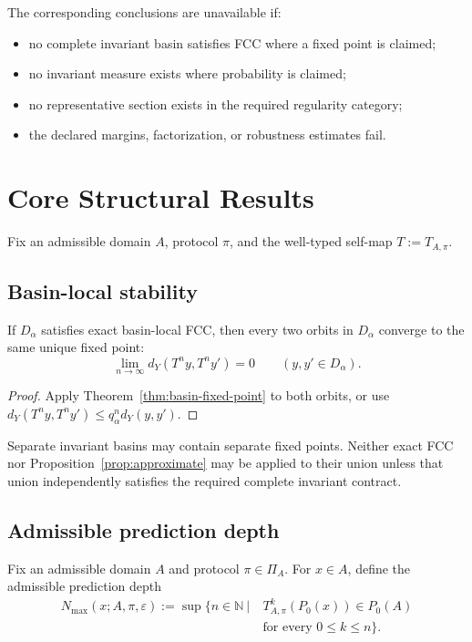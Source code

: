 \documentclass[11pt]{article}
\theoremstyle{plain}
\theoremstyle{plain}
\begin{document}
The corresponding conclusions are unavailable if:
\begin{itemize}
\item no complete invariant basin satisfies FCC where a fixed point is claimed;
\item no invariant measure exists where probability is claimed;
\item no representative section exists in the required regularity category;
\item the declared margins, factorization, or robustness estimates fail.
\end{itemize}


\section{Core Structural Results}

Fix an admissible domain $A$, protocol $\pi$, and the well-typed self-map
$T:=T_{A,\pi}$.

\subsection{Basin-local stability}

\begin{theorem}
If $D_\alpha$ satisfies exact basin-local FCC, then every two orbits in
$D_\alpha$ converge to the same unique fixed point:
\[
\lim_{n\to\infty}d_Y(T^ny,T^ny')=0
\qquad(y,y'\in D_\alpha).
\]
\end{theorem}

\begin{proof}
Apply Theorem~\ref{thm:basin-fixed-point} to both orbits, or use
$d_Y(T^ny,T^ny')\le q_\alpha^n d_Y(y,y')$.
\end{proof}

\begin{remark}
Separate invariant basins may contain separate fixed points.  Neither exact
FCC nor Proposition~\ref{prop:approximate} may be applied to their union
unless that union independently satisfies the required complete invariant
contract.
\end{remark}
\subsection{Admissible prediction depth}

\begin{definition}
Fix an admissible domain $A$ and protocol $\pi\in\Pi_A$.
For $x\in A$, define the admissible prediction depth
\[
\begin{aligned}
N_{\max}(x;A,\pi,\varepsilon)
:=\sup\big\{n\in\mathbb{N}\ \big|\ &
T_{A,\pi}^k(P_0(x))\in P_0(A)\\
&\text{for every }0\le k\le n\big\}.
\end{aligned}
\]
\end{definition}
\end{document}
